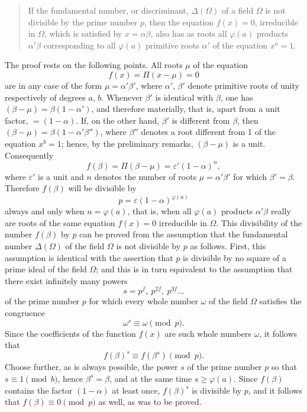 \documentclass[11pt]{article}
\newcommand{\origpage}[1]{\par\vspace{0.25em}\noindent{\footnotesize\itshape [Printed page #1]}\par\vspace{0.25em}}
\begin{document}
\begin{quote}
If the fundamental number, or discriminant, $\Delta(\Omega)$ of a field $\Omega$ is not divisible by the prime number $p$, then the equation $f(x)=0$, irreducible in $\Omega$, which is satisfied by $x=\alpha\beta$, also has as roots all $\varphi(a)$ products $\alpha'\beta$ corresponding to all $\varphi(a)$ primitive roots $\alpha'$ of the equation $x^a=1$.
\end{quote}

\origpage{413}
The proof rests on the following points. All roots $\mu$ of the equation
\[
 f(x)=\Pi(x-\mu)=0
\]
are in any case of the form $\mu=\alpha'\beta'$, where $\alpha'$, $\beta'$ denote primitive roots of unity respectively of degrees $a$, $b$. Whenever $\beta'$ is identical with $\beta$, one has $(\beta-\mu)=\beta(1-\alpha')$, and therefore materially, that is, apart from a unit factor, $=(1-\alpha)$. If, on the other hand, $\beta'$ is different from $\beta$, then $(\beta-\mu)=\beta(1-\alpha'\beta'')$, where $\beta''$ denotes a root different from 1 of the equation $x^b=1$; hence, by the preliminary remarks, $(\beta-\mu)$ is a unit. Consequently
\[
 f(\beta)=\Pi(\beta-\mu)=\varepsilon'(1-\alpha)^n,
\]
where $\varepsilon'$ is a unit and $n$ denotes the number of roots $\mu=\alpha'\beta'$ for which $\beta'=\beta$. Therefore $f(\beta)$ will be divisible by
\[
 p=\varepsilon(1-\alpha)^{\varphi(a)}
\]
always and only when $n=\varphi(a)$, that is, when all $\varphi(a)$ products $\alpha'\beta$ really are roots of the same equation $f(x)=0$ irreducible in $\Omega$. This divisibility of the number $f(\beta)$ by $p$ can be proved from the assumption that the fundamental number $\Delta(\Omega)$ of the field $\Omega$ is not divisible by $p$ as follows. First, this assumption is identical with the assertion that $p$ is divisible by no square of a prime ideal of the field $\Omega$; and this is in turn equivalent to the assumption that there exist infinitely many powers
\[
 s=p^f,\ p^{2f},\ p^{3f}\ldots
\]
of the prime number $p$ for which every whole number $\omega$ of the field $\Omega$ satisfies the congruence
\[
 \omega^s\equiv \omega\pmod p.
\]
Since the coefficients of the function $f(x)$ are such whole numbers $\omega$, it follows that
\[
 f(\beta)^s\equiv f(\beta^s)\pmod p.
\]
Choose further, as is always possible, the power $s$ of the prime number $p$ so that $s\equiv1\pmod b$, hence $\beta^s=\beta$, and at the same time $s\geq \varphi(a)$. Since $f(\beta)$ contains the factor $(1-\alpha)$ at least once, $f(\beta)^s$ is divisible by $p$, and it follows that $f(\beta)\equiv0\pmod p$ as well, as was to be proved.
\end{document}

